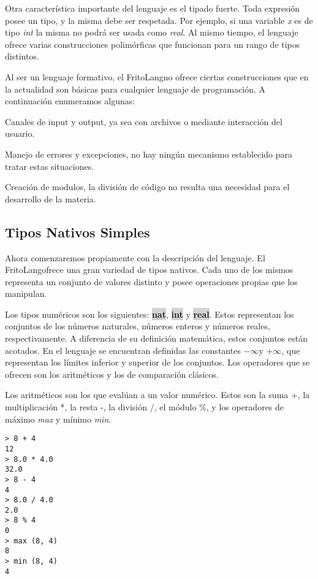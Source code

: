 \documentclass{article}
\newcommand{\Lang}{FritoLang} %
\newcommand{\type}[1]{\colorbox{lightgray}{\textbf{#1}}}
\newcommand{\pinf}{$+\infty$}
\newcommand{\ninf}{$-\infty$}
\begin{document}
Otra característica importante del lenguaje es el tipado fuerte.
Toda expresión posee un tipo, y la misma debe ser respetada.
Por ejemplo, si una variable \textit{x} es de tipo \textit{int} la misma no podrá ser usada como \textit{real}.
Al mismo tiempo, el lenguaje ofrece varias construcciones polimórficas que funcionan para un rango de tipos distintos.

Al ser un lenguaje formativo, el \Lang\space no ofrece ciertas construcciones que en la actualidad son básicas para cualquier lenguaje de programación.
A continuación enumeramos algunas:
\begin{enumerate*}
\item Canales de input y output, ya sea con archivos o mediante interacción del usuario.
\item Manejo de errores y excepciones, no hay ningún mecanismo establecido para tratar estas situaciones.
\item Creación de modulos, la división de código no resulta una necesidad para el desarrollo de la materia.
\end{enumerate*}

\subsection{Tipos Nativos Simples}
Ahora comenzaremos propiamente con la descripción del lenguaje.
El \Lang\space ofrece una gran variedad de tipos nativos.
Cada uno de los mismos representa un conjunto de valores distinto y posee operaciones propias que los manipulan.

Los tipos numéricos son los siguientes: \type{nat}, \type{int} y \type{real}.
Estos representan los conjuntos de los números naturales, números enteros y números reales, respectivamente.
A diferencia de su definición matemática, estos conjuntos están acotados.
En el lenguaje se encuentran definidas las constantes \ninf\space y \pinf, que representan los límites inferior y superior de los conjuntos.
Los operadores que se ofrecen son los aritméticos y los de comparación clásicos.

Los aritméticos son los que evalúan a un valor numérico.
Estos son la suma +, la multiplicación *, la resta -, la división /, el módulo \%, y los operadores de máximo \textit{max} y mínimo \textit{min}.

\begin{lstlisting}
> 8 + 4
12
> 8.0 * 4.0
32.0
> 8 - 4
4
> 8.0 / 4.0
2.0
> 8 % 4
0
> max (8, 4)
8
> min (8, 4)
4
\end{lstlisting}
\end{document}
